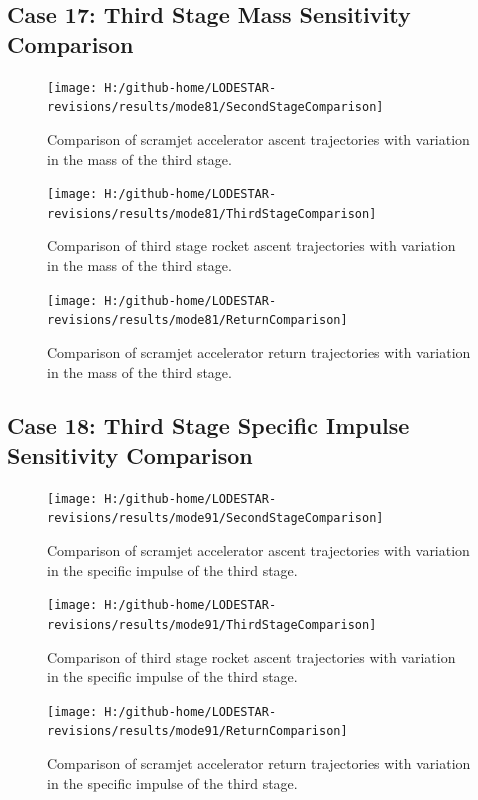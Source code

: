 \subsection{Case 17: Third Stage Mass Sensitivity Comparison}\label{sec:app_comparison81}
\begin{figure}[!th]
\centering
\texttt{[image: H:/github-home/LODESTAR-revisions/results/mode81/SecondStageComparison]}
\caption{Comparison of scramjet accelerator ascent trajectories with variation in the mass of the third stage.}
\label{fig:SecondStageComparison14}
\end{figure}
\begin{figure}[!th]
\centering
\texttt{[image: H:/github-home/LODESTAR-revisions/results/mode81/ThirdStageComparison]}
\caption{Comparison of third stage rocket ascent trajectories with variation in the mass of the third stage.}
\label{fig:ThirdStageComparison14}
\end{figure}
\begin{figure}[!th]
	\centering
	\texttt{[image: H:/github-home/LODESTAR-revisions/results/mode81/ReturnComparison]}
	\caption{Comparison of scramjet accelerator return trajectories with variation in the mass of the third stage.}
	\label{fig:ReturnComparison14}
\end{figure}
\FloatBarrier
\clearpage
\subsection{Case 18: Third Stage Specific Impulse Sensitivity Comparison}\label{sec:app_comparison91}
\begin{figure}[!th]
\centering
\texttt{[image: H:/github-home/LODESTAR-revisions/results/mode91/SecondStageComparison]}
\caption{Comparison of scramjet accelerator ascent trajectories with variation in the specific impulse of the third stage.}
\label{fig:SecondStageComparison15}
\end{figure}
\begin{figure}[!th]
\centering
\texttt{[image: H:/github-home/LODESTAR-revisions/results/mode91/ThirdStageComparison]}
\caption{Comparison of third stage rocket ascent trajectories with variation in the specific impulse of the third stage.}
\label{fig:ThirdStageComparison15}
\end{figure}
\begin{figure}[!th]
\centering
\texttt{[image: H:/github-home/LODESTAR-revisions/results/mode91/ReturnComparison]}
\caption{Comparison of scramjet accelerator return trajectories with variation in the specific impulse of the third stage.}
\label{fig:ReturnComparison15}
\end{figure}
\FloatBarrier
\clearpage

